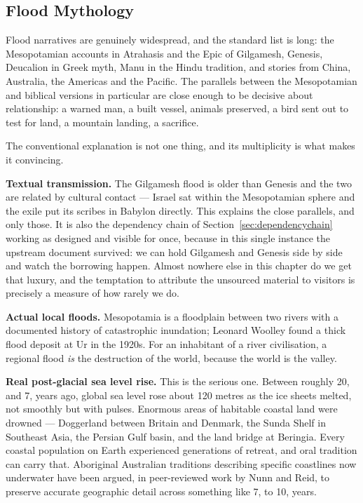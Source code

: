 \subsection{Flood Mythology}\label{sec:floodmythology}

Flood narratives are genuinely widespread, and the standard list is long: the Mesopotamian
accounts in Atrahasis and the Epic of Gilgamesh, Genesis, Deucalion in Greek myth, Manu in the
Hindu tradition, and stories from China, Australia, the Americas and the Pacific. The
parallels between the Mesopotamian and biblical versions in particular are close enough to be
decisive about relationship: a warned man, a built vessel, animals preserved, a bird sent out to
test for land, a mountain landing, a sacrifice.

The conventional explanation is not one thing, and its multiplicity is what makes it convincing.

\textbf{Textual transmission.} The Gilgamesh flood is older than Genesis and the two are related
by cultural contact --- Israel sat within the Mesopotamian sphere and the exile put its scribes
in Babylon directly. This explains the close parallels, and only those. It is also the
dependency chain of Section~\ref{sec:dependencychain} working as designed and visible for once,
because in this single instance the upstream document survived: we can hold Gilgamesh and
Genesis side by side and watch the borrowing happen. Almost nowhere else in this chapter do we
get that luxury, and the temptation to attribute the unsourced material to visitors is
precisely a measure of how rarely we do.

\textbf{Actual local floods.} Mesopotamia is a floodplain between two rivers with a documented
history of catastrophic inundation; Leonard Woolley found a thick flood deposit at Ur in the
1920s. For an inhabitant of a river civilisation, a regional flood \emph{is} the destruction of
the world, because the world is the valley.

\textbf{Real post-glacial sea level rise.} This is the serious one. Between roughly 20, and
7, years ago, global sea level rose about 120 metres as the ice sheets melted, not smoothly
but with pulses. Enormous areas of habitable coastal land were drowned --- Doggerland between
Britain and Denmark, the Sunda Shelf in Southeast Asia, the Persian Gulf basin, and the land
bridge at Beringia. Every coastal population on Earth experienced generations of retreat, and
oral tradition can carry that. Aboriginal Australian traditions describing specific coastlines
now underwater have been argued, in peer-reviewed work by Nunn and Reid, to preserve accurate
geographic detail across something like 7, to 10, years.

